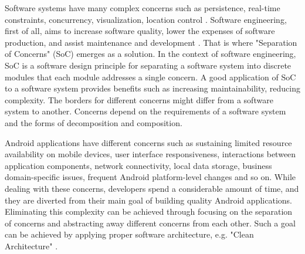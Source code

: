 Software systems have many complex concerns such as persistence, real-time constraints, concurrency, visualization, location control \cite{27}. Software engineering, first of all, aims to increase software quality, lower the expenses of software production, and assist maintenance and development \cite{28}. That is where "Separation of Concerns" (SoC) emerges as a solution. In the context of software engineering, SoC is a software design principle for separating a software system into discrete modules that each module addresses a single concern. A good application of SoC to a software system provides benefits such as increasing maintainability, reducing complexity. The borders for different concerns might differ from a software system to another. Concerns depend on the requirements of a software system and the forms of decomposition and composition. 

Android applications have different concerns such as sustaining limited resource availability on mobile devices, user interface responsiveness,  interactions between application components,  network connectivity, local data storage, business domain-specific issues, frequent Android platform-level changes and so on. While dealing with these concerns, developers spend a considerable amount of time, and they are diverted from their main goal of building quality Android applications. Eliminating this complexity can be achieved through focusing on the separation of concerns and abstracting away different concerns from each other. Such a goal can be achieved by applying proper software architecture, e.g. "Clean Architecture" \cite{56}.
